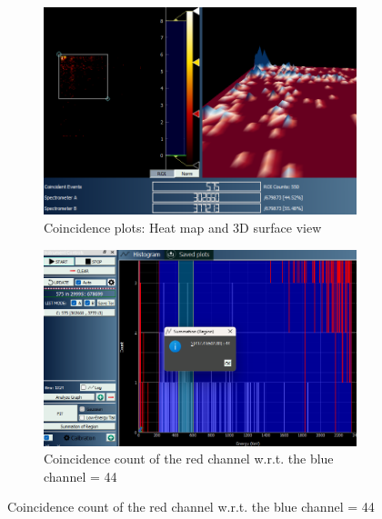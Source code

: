 \begin{figure}[H]
    \begin{subfigure}{\linewidth}
    \includegraphics[width=1\textwidth]{images/90/3d.png}
    \caption{Coincidence plots: Heat map and 3D surface view}
    \end{subfigure}
    
    \begin{subfigure}{\linewidth}
    \includegraphics[width=1\textwidth]{images/90/ccred.png}
    \caption{Coincidence count of the red channel w.r.t. the blue channel = 44}
    \end{subfigure}

    

\end{figure}


